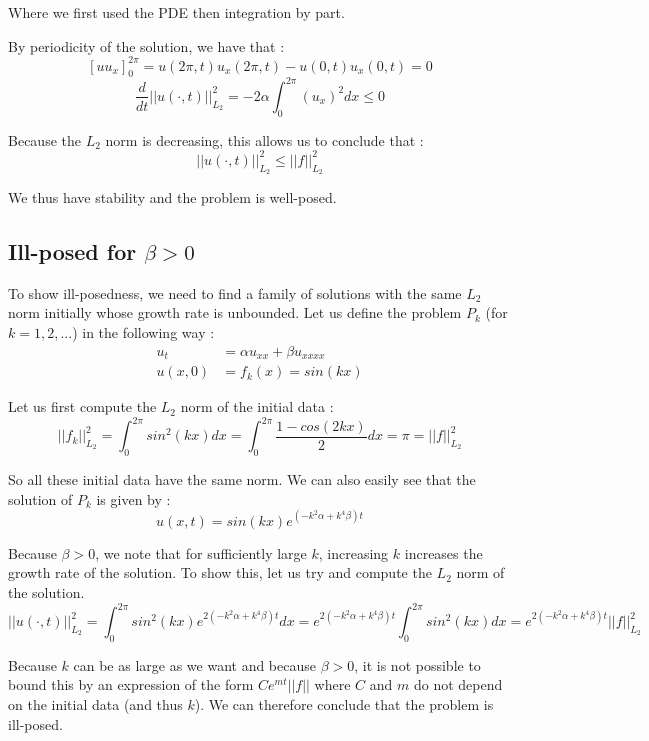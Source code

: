 Where we first used the PDE then integration by part.

By periodicity of the solution, we have that :
$$[uu_x]^{2\pi}_0 = u(2\pi,t)u_x(2\pi,t) - u(0,t)u_x(0,t) = 0$$
$$\frac{d}{dt} ||u(\cdot,t)||^2_{L_2}  = -2\alpha \int_0^{2\pi} (u_x)^2 dx \leq 0$$

Because the $L_2$ norm is decreasing, this allows us to conclude that : 
$$ ||u(\cdot,t)||^2_{L_2} \leq ||f||^2_{L_2}$$

We thus have stability and the problem is well-posed.

\subsection{Ill-posed for $\beta>0$}
To show ill-posedness, we need to find a family of solutions with the same $L_2$ norm initially whose growth rate is unbounded. Let us define the problem $P_k$ (for $k=1,2,...$) in the following way :
\begin{align*}
u_t &= \alpha u_{xx} + \beta u_{xxxx}\\
u(x,0) &= f_k(x) = sin(kx)
\end{align*}

Let us first compute the $L_2$ norm of the initial data : 
$$||f_k||^2_{L_2} = \int_0^{2\pi} sin^2(kx)dx=\int_0^{2\pi} \frac{1-cos(2kx)}{2}dx=\pi = ||f||^2_{L_2}$$ 

So all these initial data have the same norm. We can also easily see that the solution of $P_k$ is given by :
$$u(x,t) = sin(kx)e^{(-k^2\alpha + k^4\beta)t}$$ 

Because $\beta > 0$, we note that for sufficiently large $k$, increasing $k$ increases the growth rate of the solution. To show this, let us try and compute the $L_2$ norm of the solution.
$$||u(\cdot,t)||_{L_2}^2=\int_0^{2\pi} sin^2(kx)e^{2(-k^2\alpha + k^4\beta)t}dx= e^{2(-k^2\alpha + k^4\beta)t}\int_0^{2\pi} sin^2(kx)dx = e^{2(-k^2\alpha + k^4\beta)t} ||f||^2_{L_2} $$

Because $k$ can be as large as we want and because $\beta > 0$, it is not possible to bound this by an expression of the form $Ce^{mt}||f||$ where $C$ and $m$ do not depend on the initial data (and thus $k$). We can therefore conclude that the problem is ill-posed. 

